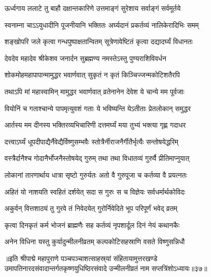 \twolineshloka
{ऊर्ध्वगाय ललाटे तु बाहौ दक्षान्तकारिणे}
{उत्तमाङ्गं सुरेशाय सर्वाङ्गं सर्वमूर्तये}%

\twolineshloka
{स्वनाम्ना चाऽऽयुधादीनि पूजनीयानि भक्तितः}
{अर्घ्यदानं प्रकर्तव्यं नालिकेरादिभिः समम्}%

\twolineshloka
{शङ्खोपरि जले कृत्वा गन्धपुष्पाक्षतान्वितम्}
{सूत्रेणावेष्टितं कृत्वा दद्यादर्घ्यं विधानतः}%

\twolineshloka
{देवदेव महादेव श्रीकेशव जनार्दन}
{सुब्रह्मण्य नमस्तेऽस्तु पुण्यराशिविवर्धन}%

\twolineshloka
{शोकमोहमहापापान्मामुद्धर भवार्णवात्}
{सुकृतं न कृतं किञ्चिज्जन्मकोटिशतैरपि}%

\twolineshloka
{तथाऽपि मां महास्वामिन् मामुद्धर भवार्णवात्}
{व्रतेनानेन देवेश ये चान्ये मम पूर्वजाः}%

\twolineshloka
{वियोनिं च गताश्चान्ये पापमृत्युवशं गताः}
{ये भविष्यन्ति येऽतीताः प्रेतलोकान् समुद्धर}%

\twolineshloka
{आर्तस्य मम दीनस्य भक्तिरव्यभिचारिणी}
{दत्तमर्घ्यं मया तुभ्यं भक्त्या गृह्ण गदाधर}%

\twolineshloka
{दत्त्वाऽर्घ्यं धूपदीपाद्यैर्नैवेद्यैर्विष्णुसम्भवैः}
{स्तोत्रैर्नीराजनैर्गीतैर्भृत्यैः सन्तोषयेद्धरिम्}%

\twolineshloka
{वस्त्रैर्दानैश्च गोदानैर्भोजनैस्तोषयेद् गुरुम्}
{तथा तथा विधातव्यं गुरुर्वै प्रीतिमाप्नुयात्}%

\twolineshloka
{लोकानां तारणार्थाय धात्रा सृष्टो गुरुर्यतः}
{अतो वै गुरुपूजा च कर्तव्या वै प्रयत्नतः}%

\twolineshloka
{अहितं यो नाशयति स्वहितं दर्शयेत् सदा}
{स गुरुः स च विज्ञेयः सर्वधर्मार्थकोविदः}%

\twolineshloka
{अकुर्वन् वित्तशाठ्यं तु गुरवे तं निवेदयेत्}
{गुरोर्निवेदिते भूप परिपूर्णं भवेद् व्रतम्}%

\twolineshloka
{कृत्वा दिनकृतं कर्म भोजनं ब्राह्मणैः सह}
{कर्तव्यं नृपशार्दूल दिनं नेयं कथानकैः}%

\twolineshloka
{अनेन विधिना यस्तु कुर्यादुन्मीलनीव्रतम्}
{कल्पकोटिसहस्राणि वसते विष्णुसन्निधौ}%

॥इति श्रीपाद्मे महापुराणे पञ्चपञ्चाशत्साहस्र्यां संहितायामुत्तरखण्डे उमापतिनारदसंवादान्तर्गतकृष्णयुधिष्ठिरसंवादे उन्मीलनीव्रतं नाम सप्तत्रिंशोऽध्यायः॥३७॥

\genMangalaShloka

\hyperref[sec:ekadashi_mahatmyam_padma_puranam]{\closesub}
\clearpage

